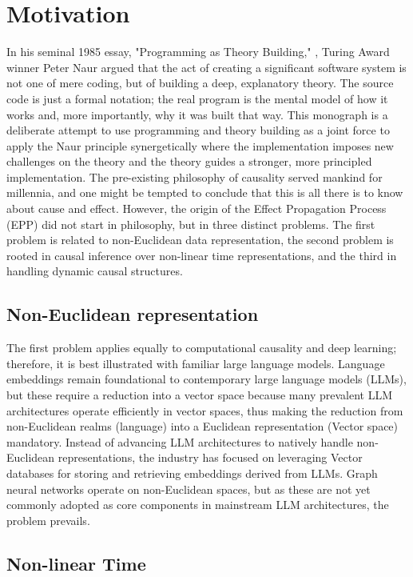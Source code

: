 \section{Motivation}
\label{sec:motivation}

In his seminal 1985 essay, "Programming as Theory Building," \cite{naur1985programming}, Turing Award winner Peter Naur argued that the act of creating a significant software system is not one of mere coding, but of building a deep, explanatory theory. The source code is just a formal notation; the real program is the mental model of how it works and, more importantly, why it was built that way. 
This monograph is a deliberate attempt to use programming and theory building as a joint force to 
apply the Naur principle synergetically where the implementation imposes new challenges on the theory 
and the theory guides a stronger, more principled implementation. 
The pre-existing philosophy of causality served mankind for millennia, and one might be tempted to conclude that this is all there is to know about cause and effect. However, the origin of the Effect Propagation Process (EPP) did not start in philosophy, but in three distinct problems. The first problem is related to non-Euclidean data representation, the second problem is rooted in causal inference over non-linear time representations, and the third in handling dynamic causal structures.

\subsection{Non-Euclidean representation}

The first problem applies equally to computational causality and deep learning; therefore, it is best illustrated with familiar  large language models. Language embeddings remain foundational to contemporary large language models (LLMs), but these require a reduction into a vector space because many prevalent LLM architectures operate efficiently in vector spaces, thus making the reduction from non-Euclidean realms (language) into a Euclidean representation (Vector space) mandatory. Instead of advancing LLM architectures to natively handle non-Euclidean representations, the industry has focused on leveraging Vector databases for storing and retrieving embeddings derived from LLMs. Graph neural networks operate on non-Euclidean spaces, but as these are not yet commonly adopted as core components in mainstream LLM architectures, the problem prevails.

\subsection{Non-linear Time}

